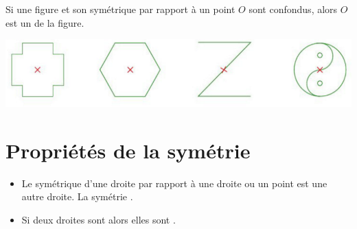 \documentclass[xcolor={dvipsnames}]{beamer}
\begin{document}
\begin{frame}
	\begin{mydef}
		Si une figure et son symétrique \pause par rapport à un point $O$ sont confondus, alors \pause $O$ est un  de la figure.\pause
		
	\end{mydef}
	
	\begin{myexs}
		\begin{center}
			\includegraphics[scale=0.5]{centres}
		\end{center}
	\end{myexs}
\end{frame}
\section{Propriétés de la symétrie}

\begin{frame}
	\begin{myprops}
		\begin{itemize}
			\item Le symétrique d'une droite par rapport à une droite ou un point est une autre droite. La symétrie .
			\item Si deux droites sont  alors elles sont .
		\end{itemize}
	\end{myprops}
\end{frame}
\end{document}
